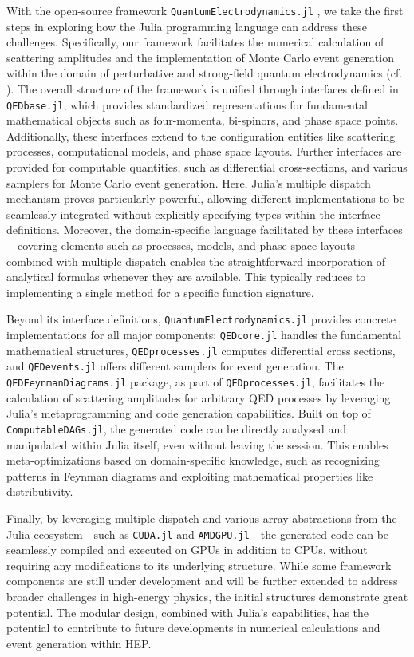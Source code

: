 \documentclass{webofc}
\begin{document}
With the open-source framework \texttt{QuantumElectrodynamics.jl}
\cite{qedjl-github}, we take the first steps in exploring how the Julia
programming language can address these challenges. Specifically, our framework
facilitates the numerical calculation of scattering amplitudes and the
implementation of Monte Carlo event generation within the domain of perturbative
and strong-field quantum electrodynamics (cf. \cite{Fedotov:2022ely}). The
overall structure of the framework is unified through interfaces defined in
\texttt{QEDbase.jl}, which provides standardized representations for fundamental
mathematical objects such as four-momenta, bi-spinors, and phase space points.
Additionally, these interfaces extend to the configuration entities like
scattering processes, computational models, and phase space layouts. Further
interfaces are provided for computable quantities, such as differential
cross-sections, and various samplers for Monte Carlo event generation. Here,
Julia’s multiple dispatch mechanism proves particularly powerful, allowing
different implementations to be seamlessly integrated without explicitly
specifying types within the interface definitions. Moreover, the domain-specific
language facilitated by these interfaces—covering elements such as processes,
models, and phase space layouts—combined with multiple dispatch enables the
straightforward incorporation of analytical formulas whenever they are
available. This typically reduces to implementing a single method for a specific
function signature.

Beyond its interface definitions, \texttt{QuantumElectrodynamics.jl} provides
concrete implementations for all major components: \texttt{QEDcore.jl} handles
the fundamental mathematical structures, \texttt{QEDprocesses.jl} computes
differential cross sections, and \texttt{QEDevents.jl} offers different samplers
for event generation. The \texttt{QEDFeynmanDiagrams.jl} package, as part of
\texttt{QEDprocesses.jl}, facilitates the calculation of scattering amplitudes
for arbitrary QED processes by leveraging Julia's metaprogramming and code
generation capabilities. Built on top of \texttt{ComputableDAGs.jl}, the
generated code can be directly analysed and manipulated within Julia itself,
even without leaving the session. This enables meta-optimizations based on
domain-specific knowledge, such as recognizing patterns in Feynman diagrams and
exploiting mathematical properties like distributivity.

Finally, by leveraging multiple dispatch and various array abstractions from the
Julia ecosystem—such as \texttt{CUDA.jl} and \texttt{AMDGPU.jl}—the generated
code can be seamlessly compiled and executed on GPUs in addition to CPUs,
without requiring any modifications to its underlying structure. While some
framework components are still under development and will be further extended to
address broader challenges in high-energy physics, the initial structures
demonstrate great potential. The modular design, combined with Julia's
capabilities, has the potential to contribute to future developments in
numerical calculations and event generation within HEP.
\end{document}
